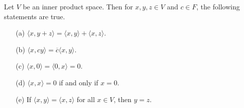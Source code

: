 \begin{theorem}
   Let \( V  \) be an inner product space. Then for \( x,y,z \in V  \) and \( c \in F  \), the following statements are true. 
   \begin{enumerate}
       \item[(a)] \( \langle x, y  + z  \rangle = \langle x,y \rangle + \langle  x,z \rangle \).
       \item[(b)] \( \langle x, cy  \rangle = \overline{c} \langle  x,y \rangle \).
        \item[(c)] \( \langle x,0 \rangle = \langle 0,x \rangle = 0  \).
        \item[(d)] \( \langle x,x \rangle = 0  \) if and only if \( x = 0  \).
        \item[(e)] If \( \langle x,y \rangle = \langle x,z \rangle \) for all \( x \in V  \), then \( y = z  \).
   \end{enumerate}
\end{theorem}

